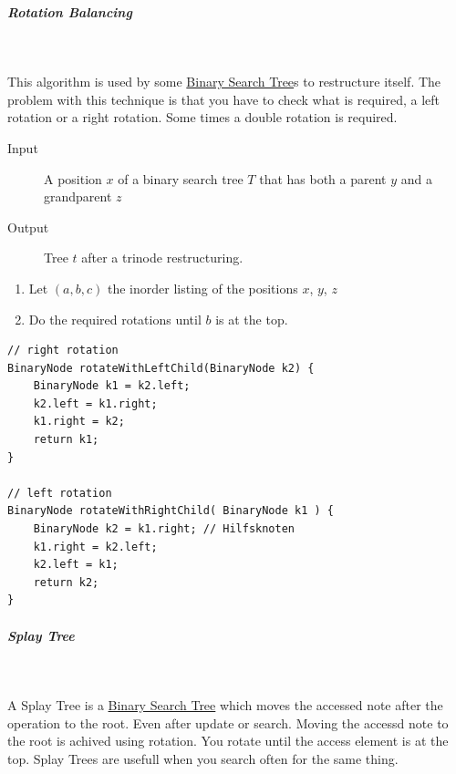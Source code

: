 \documentclass[11pt,twoside,twocolumn,landscape]{article}
\begin{document}
\subparagraph{Rotation Balancing} \
\label{sec:org85a8a5c}

This algorithm is used by some \href{../../../roam/20211008140953-binary_search_tree.org}{Binary Search Tree}s to restructure itself.
The problem with this technique is that you have to check what is required, a left rotation or a right rotation.
Some times a double rotation is required. 


\begin{description}
\item[{Input}] A position \(x\) of a binary search tree \(T\) that has both a parent \(y\) and a grandparent \(z\)
\item[{Output}] Tree \(t\) after a trinode restructuring.
\end{description}


\begin{enumerate}
\item Let \((a, b, c)\) the inorder listing of the positions \(x\), \(y\), \(z\)
\item Do the required rotations until \(b\) is at the top.
\end{enumerate}


\lstset{language=java,label= ,caption= ,captionpos=b,numbers=none}
\begin{lstlisting}
// right rotation
BinaryNode rotateWithLeftChild(BinaryNode k2) {
    BinaryNode k1 = k2.left;
    k2.left = k1.right;
    k1.right = k2;
    return k1;
}

// left rotation
BinaryNode rotateWithRightChild( BinaryNode k1 ) {
    BinaryNode k2 = k1.right; // Hilfsknoten
    k1.right = k2.left;
    k2.left = k1;
    return k2;
}
\end{lstlisting}



\subparagraph{Splay Tree} \
\label{sec:org04358b4}

A Splay Tree is a \href{../../../roam/20211008140953-binary_search_tree.org}{Binary Search Tree} which moves the accessed note after the operation to the root.
Even after update or search.
Moving the accessd note to the root is achived using rotation.
You rotate until the access element is at the top.
Splay Trees are usefull when you search often for the same thing.
\end{document}
